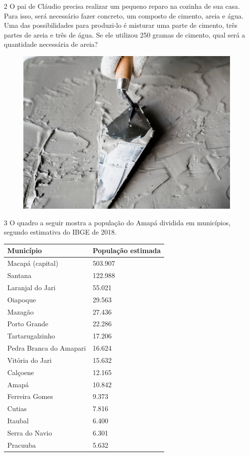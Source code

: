 \num{2} O pai de Cláudio precisa realizar um pequeno reparo na cozinha de sua casa.
Para isso, será necessário fazer concreto, um composto de cimento, areia e água. 
Uma das possibilidades para produzi-lo é misturar uma parte de cimento, 
três partes de areia e três de água. Se ele utilizou 250 gramas de cimento, 
qual será a quantidade necessária de areia? 

\begin{figure}[htpb!]
\centering
\includegraphics[width=.5\textwidth]{media/image14a.jpg}
\end{figure}

\num{3} O quadro a seguir mostra a população do Amapá dividida em municípios, segundo estimativa do IBGE de 2018.

\begin{longtable}[]{@{}ll@{}}
\toprule
Município & População estimada\tabularnewline
\midrule
\endhead
Macapá (capital) & 503.907\tabularnewline
Santana & 122.988\tabularnewline
Laranjal do Jari & 55.021\tabularnewline
Oiapoque & 29.563\tabularnewline
Mazagão & 27.436\tabularnewline
Porto Grande & 22.286\tabularnewline
Tartarugalzinho & 17.206\tabularnewline
Pedra Branca do Amapari & 16.624\tabularnewline
Vitória do Jari & 15.632\tabularnewline
Calçoene & 12.165\tabularnewline
Amapá & 10.842\tabularnewline
Ferreira Gomes & 9.373\tabularnewline
Cutias & 7.816\tabularnewline
Itaubal & 6.400\tabularnewline
Serra do Navio & 6.301\tabularnewline
Pracuuba & 5.632\tabularnewline
\bottomrule
\end{longtable}

